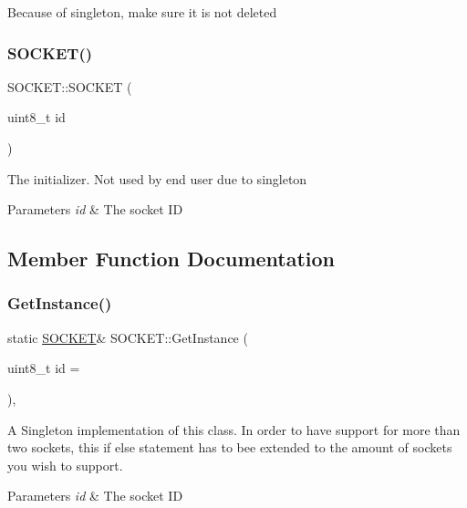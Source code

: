 Because of singleton, make sure it is not deleted \hypertarget{class_s_o_c_k_e_t_ab87e109918e43ba097c153114f4f6494}{}\label{class_s_o_c_k_e_t_ab87e109918e43ba097c153114f4f6494} 
\subsubsection{\texorpdfstring{S\+O\+C\+K\+E\+T()}{SOCKET()}\hspace{0.1cm}{\footnotesize\ttfamily [2/2]}}
{\footnotesize\ttfamily S\+O\+C\+K\+E\+T\+::\+S\+O\+C\+K\+ET (\begin{DoxyParamCaption}\item[{uint8\+\_\+t}]{id }\end{DoxyParamCaption})\hspace{0.3cm}{\ttfamily [inline]}}

The initializer. Not used by end user due to singleton 
\begin{DoxyParams}{Parameters}
{\em id} & The socket ID \\
\hline
\end{DoxyParams}


\subsection{Member Function Documentation}
\hypertarget{class_s_o_c_k_e_t_acd81e49443c51d84f7bfe5d616d1b750}{}\label{class_s_o_c_k_e_t_acd81e49443c51d84f7bfe5d616d1b750} 
\subsubsection{\texorpdfstring{Get\+Instance()}{GetInstance()}}
{\footnotesize\ttfamily static \hyperlink{class_s_o_c_k_e_t}{S\+O\+C\+K\+ET}\& S\+O\+C\+K\+E\+T\+::\+Get\+Instance (\begin{DoxyParamCaption}\item[{uint8\+\_\+t}]{id = {} }\end{DoxyParamCaption})\hspace{0.3cm}{\ttfamily [inline]}, {\ttfamily [static]}}

A Singleton implementation of this class. In order to have support for more than two sockets, this if else statement has to bee extended to the amount of sockets you wish to support. 
\begin{DoxyParams}{Parameters}
{\em id} & The socket ID \\
\hline
\end{DoxyParams}
\hypertarget{class_s_o_c_k_e_t_ab1345aded87c899fd525616b6f2cca4a}{}\label{class_s_o_c_k_e_t_ab1345aded87c899fd525616b6f2cca4a} 
